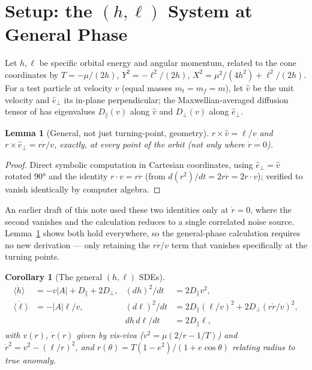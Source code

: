 \documentclass[12pt]{amsart}
\theoremstyle{plain}
\newtheorem{corollary}[theorem]{Corollary}
\newtheorem{lemma}[theorem]{Lemma}
\theoremstyle{remark}
\begin{document}
\section{Setup: the $(h,\ell)$ System at General Phase}

Let $h,\ell$ be specific orbital energy and angular momentum, related to the cone coordinates by $T=-\mu/(2h)$, $Y^2=-\ell^2/(2h)$, $X^2=\mu^2/(4h^2)+\ell^2/(2h)$. For a test particle at velocity $v$ (equal masses $m_t=m_f=m$), let $\hat v$ be the unit velocity and $\hat e_\perp$ its in-plane perpendicular; the Maxwellian-averaged diffusion tensor of \cite{Ebert2026Rosenbluth} has eigenvalues $D_\parallel(v)$ along $\hat v$ and $D_\perp(v)$ along $\hat e_\perp$.

\begin{lemma}[General, not just turning-point, geometry]\label{lem:general}
$r\times\hat v = \ell/v$ and $r\times\hat e_\perp = r\dot r/v$, exactly, at every point of the orbit (not only where $\dot r=0$).
\end{lemma}

\begin{proof}
Direct symbolic computation in Cartesian coordinates, using $\hat e_\perp=\hat v$ rotated $90°$ and the identity $r\cdot v=r\dot r$ (from $d(r^2)/dt=2r\dot r=2r\cdot v$); verified to vanish identically by computer algebra.
\end{proof}

An earlier draft of this note used these two identities only at $\dot r=0$, where the second vanishes and the calculation reduces to a single correlated noise source. Lemma~\ref{lem:general} shows both hold everywhere, so the general-phase calculation requires no new derivation --- only retaining the $r\dot r/v$ term that vanishes specifically at the turning points.

\begin{corollary}[The general $(h,\ell)$ SDEs]\label{cor:general_sde}
\begin{align}
\langle\dot h\rangle &= -v|A|+D_\parallel+2D_\perp, & (dh)^2/dt &= 2D_\parallel v^2, \tag{1}\\
\langle\dot\ell\rangle &= -|A|\ell/v, & (d\ell)^2/dt &= 2D_\parallel(\ell/v)^2+2D_\perp(r\dot r/v)^2, \tag{2}\\
& & dh\,d\ell/dt &= 2D_\parallel\ell, \tag{3}
\end{align}
with $v(r)$, $\dot r(r)$ given by vis-viva ($v^2=\mu(2/r-1/T)$) and $\dot r^2=v^2-(\ell/r)^2$, and $r(\theta)=T(1-e^2)/(1+e\cos\theta)$ relating radius to true anomaly.
\end{corollary}
\end{document}
